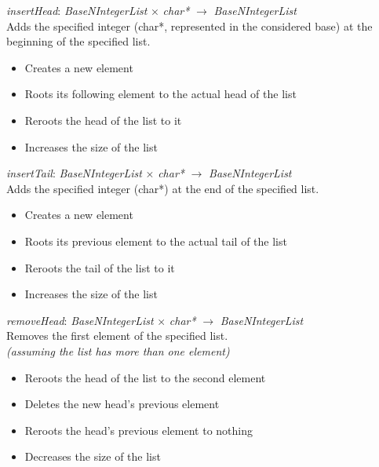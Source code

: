 \documentclass[book, backcover, english, nodocumentinfo]{upmethodology-document}
\begin{document}
		\begin{minipage}{\linewidth}
			\textit{insertHead}: \textit{BaseNIntegerList} $\times$ \textit{char*} $\rightarrow$ \textit{BaseNIntegerList}\\
			Adds the specified integer (char*, represented in the considered base) at the beginning of the specified list.\\
			\ov
			\begin{itemize}
				\item Creates a new element
				\item Roots its following element to the actual head of the list
				\item Reroots the head of the list to it
				\item Increases the size of the list
			\end{itemize}
			\label{algo:BNIL-InsertHead}
			
		\end{minipage}
		\nxtalgo{}

		\begin{minipage}{\linewidth}
			\textit{insertTail}: \textit{BaseNIntegerList} $\times$ \textit{char*} $\rightarrow$ \textit{BaseNIntegerList}\\
			Adds the specified integer (char*) at the end of the specified list.\\
			\ov
			\begin{itemize}
				\item Creates a new element
				\item Roots its previous element to the actual tail of the list
				\item Reroots the tail of the list to it
				\item Increases the size of the list
			\end{itemize}
			\label{algo:BNIL-InsertTail}
			
		\end{minipage}
		\nxtalgo{}

		\begin{minipage}{\linewidth}
			\textit{removeHead}: \textit{BaseNIntegerList} $\times$ \textit{char*} $\rightarrow$ \textit{BaseNIntegerList}\\
			Removes the first element of the specified list.\\
			\ov \textit{ (assuming the list has more than one element)}
			\begin{itemize}
				\item Reroots the head of the list to the second element
				\item Deletes the new head's previous element
				\item Reroots the head's previous element to nothing
				\item Decreases the size of the list
			\end{itemize}
			\label{algo:BNIL-RemoveHead}
			
		\end{minipage}
		\nxtalgo{}
\end{document}
